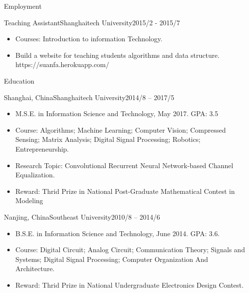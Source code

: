 \documentclass[]{minhuacv}
\begin{document}
\begin{cvsection}{Employment}
		\begin{cvsubsection}{Teaching Assistant}{Shanghaitech University}{2015/2 - 2015/7}		
			\begin{itemize}
				\item Courses: Introduction to information Technology.
				\item Build a website for teaching students algorithms and data structure. https://suanfa.herokuapp.com/
			\end{itemize}
		\end{cvsubsection}
		
	\end{cvsection}
	
	\begin{cvsection}{Education}
		\begin{cvsubsection}{Shanghai, China}{Shanghaitech University}{2014/8 -- 2017/5}
			\begin{itemize}
				\item M.S.E. in Information Science and Technology, May 2017. GPA: 3.5
				\item Course: Algorithms; Machine Learning; Computer Vision; Compressed Sensing; Matrix Analysis; Digital Signal Processing; Robotics; Entrepreneurship.
				\item Research Topic: Convolutional Recurrent Neural Network-based Channel Equalization.
				\item Reward: Thrid Prize in National Post-Graduate Mathematical Contest in Modeling
			\end{itemize}
		\end{cvsubsection}
		\begin{cvsubsection}{Nanjing, China}{Southeast University}{2010/8 -- 2014/6}
			\begin{itemize}
				\item B.S.E. in Information Science and Technology, June 2014. GPA: 3.6.
				\item Course: Digital Circuit; Analog Circuit; Communication Theory; Signals and Systems; Digital Signal Processing; Computer Organization And Architecture.
				\item Reward: Thrid Prize in National Undergraduate Electronics Design Contest.
			\end{itemize}
		\end{cvsubsection}
	\end{cvsection}
	
\end{document}
